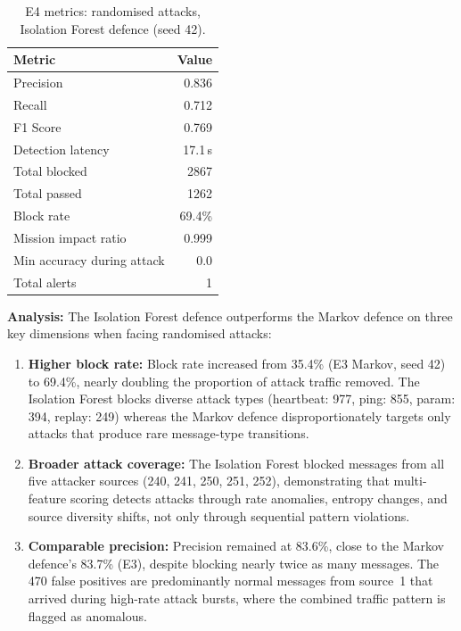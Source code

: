 \begin{table}[t]
\centering
\caption{E4 metrics: randomised attacks, Isolation Forest defence (seed 42).}
\label{tab:e4_metrics}
\renewcommand{\arraystretch}{1.15}
\begin{tabular}{lr}
\toprule
\textbf{Metric} & \textbf{Value} \\
\midrule
Precision & 0.836 \\
Recall & 0.712 \\
F1 Score & 0.769 \\
Detection latency & 17.1\,s \\
Total blocked & 2867 \\
Total passed & 1262 \\
Block rate & 69.4\% \\
Mission impact ratio & 0.999 \\
Min accuracy during attack & 0.0 \\
Total alerts & 1 \\
\bottomrule
\end{tabular}
\end{table}

\textbf{Analysis:}
The Isolation Forest defence outperforms the Markov defence on three key dimensions when facing randomised attacks:

\begin{enumerate}
    \item \textbf{Higher block rate:} Block rate increased from 35.4\% (E3 Markov, seed 42) to 69.4\%, nearly doubling the proportion of attack traffic removed.
    The Isolation Forest blocks diverse attack types (heartbeat: 977, ping: 855, param: 394, replay: 249) whereas the Markov defence disproportionately targets only attacks that produce rare message-type transitions.

    \item \textbf{Broader attack coverage:} The Isolation Forest blocked messages from all five attacker sources (240, 241, 250, 251, 252), demonstrating that multi-feature scoring detects attacks through rate anomalies, entropy changes, and source diversity shifts, not only through sequential pattern violations.

    \item \textbf{Comparable precision:} Precision remained at 83.6\%, close to the Markov defence's 83.7\% (E3), despite blocking nearly twice as many messages.
    The 470 false positives are predominantly normal messages from source~1 that arrived during high-rate attack bursts, where the combined traffic pattern is flagged as anomalous.
\end{enumerate}

